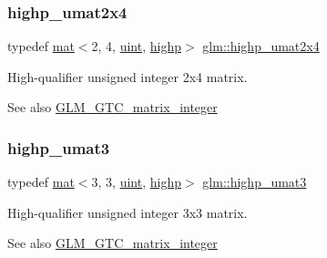\subsubsection{\texorpdfstring{highp\+\_\+umat2x4}{highp\_umat2x4}}
{\footnotesize\ttfamily typedef \mbox{\hyperlink{structglm_1_1mat}{mat}}$<$2, 4, \mbox{\hyperlink{group__core__precision_ga4fd29415871152bfb5abd588334147c8}{uint}}, \mbox{\hyperlink{namespaceglm_a36ed105b07c7746804d7fdc7cc90ff25ac6f7eab42eacbb10d59a58e95e362074}{highp}}$>$ \mbox{\hyperlink{group__gtc__matrix__integer_ga451e726ea1f020c97b2f8aa41242055b}{glm\+::highp\+\_\+umat2x4}}}

High-\/qualifier unsigned integer 2x4 matrix. \begin{DoxySeeAlso}{See also}
\mbox{\hyperlink{group__gtc__matrix__integer}{G\+L\+M\+\_\+\+G\+T\+C\+\_\+matrix\+\_\+integer}} 
\end{DoxySeeAlso}
\mbox{\label{group__gtc__matrix__integer_ga2718f6f3a37cd13e75e6839a8a5f2355}} 
\subsubsection{\texorpdfstring{highp\+\_\+umat3}{highp\_umat3}}
{\footnotesize\ttfamily typedef \mbox{\hyperlink{structglm_1_1mat}{mat}}$<$3, 3, \mbox{\hyperlink{group__core__precision_ga4fd29415871152bfb5abd588334147c8}{uint}}, \mbox{\hyperlink{namespaceglm_a36ed105b07c7746804d7fdc7cc90ff25ac6f7eab42eacbb10d59a58e95e362074}{highp}}$>$ \mbox{\hyperlink{group__gtc__matrix__integer_ga2718f6f3a37cd13e75e6839a8a5f2355}{glm\+::highp\+\_\+umat3}}}

High-\/qualifier unsigned integer 3x3 matrix. \begin{DoxySeeAlso}{See also}
\mbox{\hyperlink{group__gtc__matrix__integer}{G\+L\+M\+\_\+\+G\+T\+C\+\_\+matrix\+\_\+integer}} 
\end{DoxySeeAlso}
\mbox{\label{group__gtc__matrix__integer_ga91ed05f00d470b2448e024af7e244f49}} 
